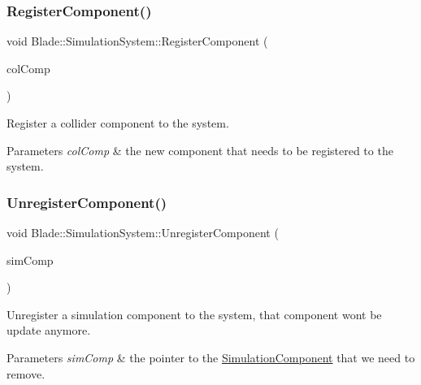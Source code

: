 \subsubsection{\texorpdfstring{Register\+Component()}{RegisterComponent()}\hspace{0.1cm}{\footnotesize\ttfamily [2/2]}}
{\footnotesize\ttfamily void Blade\+::\+Simulation\+System\+::\+Register\+Component (\begin{DoxyParamCaption}\item[{\hyperlink{class_blade_1_1_collider_component}{Collider\+Component} $\ast$}]{col\+Comp }\end{DoxyParamCaption})\hspace{0.3cm}{\ttfamily [noexcept]}}



Register a collider component to the system. 


\begin{DoxyParams}{Parameters}
{\em col\+Comp} & the new component that needs to be registered to the system. \\
\hline
\end{DoxyParams}
\mbox{\label{class_blade_1_1_simulation_system_abbe62f3517c05851909ee221d5a48c44}} 
\subsubsection{\texorpdfstring{Unregister\+Component()}{UnregisterComponent()}\hspace{0.1cm}{\footnotesize\ttfamily [1/2]}}
{\footnotesize\ttfamily void Blade\+::\+Simulation\+System\+::\+Unregister\+Component (\begin{DoxyParamCaption}\item[{\hyperlink{class_blade_1_1_simulation_component}{Simulation\+Component} $\ast$}]{sim\+Comp }\end{DoxyParamCaption})\hspace{0.3cm}{\ttfamily [noexcept]}}



Unregister a simulation component to the system, that component won\textquotesingle{}t be update anymore. 


\begin{DoxyParams}{Parameters}
{\em sim\+Comp} & the pointer to the \hyperlink{class_blade_1_1_simulation_component}{Simulation\+Component} that we need to remove. \\
\hline
\end{DoxyParams}
\mbox{\label{class_blade_1_1_simulation_system_ade3b0573c4addb1a306179fcc50a7454}} 
